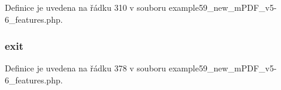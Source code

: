 Definice je uvedena na řádku 310 v souboru example59\-\_\-new\-\_\-m\-P\-D\-F\-\_\-v5-\/6\-\_\-features.\-php.

\hypertarget{example59__new__m_p_d_f__v5-6__features_8php_a6733eb5f605d09eaede9845835d71c4e}{
\subsubsection[{exit}]{\setlength{\rightskip}{0pt plus 5cm}exit}}\label{example59__new__m_p_d_f__v5-6__features_8php_a6733eb5f605d09eaede9845835d71c4e}


Definice je uvedena na řádku 378 v souboru example59\-\_\-new\-\_\-m\-P\-D\-F\-\_\-v5-\/6\-\_\-features.\-php.

